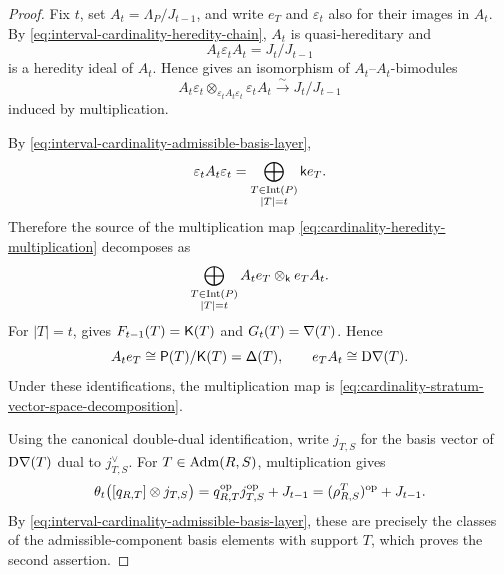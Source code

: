 \begin{proof}
Fix $t$, set $A_t=\Lambda_P/J_{t-1}$, and write $e_T$ and
$\varepsilon_t$ also for their images in $A_t$.  By
\eqref{eq:interval-cardinality-heredity-chain}, $A_t$ is
quasi-hereditary and
\[
A_t\varepsilon_tA_t=J_t/J_{t-1}
\]
is a heredity ideal of $A_t$.  Hence
\cite[Proposition~7]{DRconstruction89} gives an isomorphism of
$A_t$--$A_t$-bimodules
\begin{equation}
\label{eq:cardinality-heredity-multiplication}
A_t\varepsilon_t
\otimes_{\varepsilon_tA_t\varepsilon_t}
\varepsilon_tA_t
\xrightarrow{\sim}
J_t/J_{t-1}
\end{equation}
induced by multiplication.

By \eqref{eq:interval-cardinality-admissible-basis-layer},
\[
\varepsilon_tA_t\varepsilon_t
=
\bigoplus_{\substack{T\in\operatorname{Int}(P)\\ |T|=t}}\mathsf{k} e_T.
\]
Therefore the source of the multiplication map \eqref{eq:cardinality-heredity-multiplication} decomposes as
\[
\bigoplus_{\substack{T\in\operatorname{Int}(P)\\ |T|=t}}
A_te_T\otimes_{\mathsf{k}} e_TA_t.
\]
For $|T|=t$,  gives $F_{t-1}(T) = \mathsf K(T)$ and $G_t(T) = \mathsf\nabla(T)$. Hence 
\[
A_te_T
\cong
\mathsf P(T)/\mathsf K(T)
=
\mathsf\Delta(T),
\qquad
e_TA_t
\cong
\mathrm D\mathsf\nabla(T).
\]
Under these identifications, the multiplication map is
\eqref{eq:cardinality-stratum-vector-space-decomposition}.

Using the canonical double-dual identification, write $j_{T,S}$ for
the basis vector of $\mathrm D\mathsf\nabla(T)$ dual to $j_{T,S}^{\vee}$.
For $T\in\operatorname{Adm}(R,S)$, multiplication gives
\begin{equation}
\label{eq:cardinality-bimodule-basis-correspondence}
\theta_t\bigl([q_{R,T}]\otimes j_{T,S}\bigr)
=
q_{R,T}^{\mathrm{op}}j_{T,S}^{\mathrm{op}}+J_{t-1}
=
(\rho_{R,S}^{T})^{\mathrm{op}}+J_{t-1}.
\end{equation}
By \eqref{eq:interval-cardinality-admissible-basis-layer}, these are
precisely the classes of the admissible-component basis elements with
support $T$, which proves the second assertion.
\end{proof}


